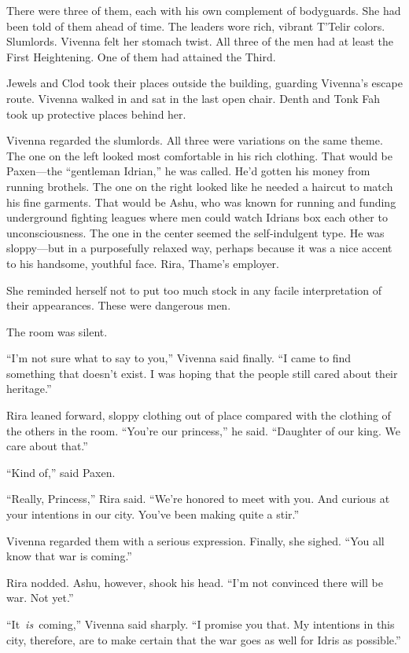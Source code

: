 There were three of them, each with his own complement of bodyguards. She had been told of them ahead of time. The leaders wore rich, vibrant T’Telir colors. Slumlords. Vivenna felt her stomach twist. All three of the men had at least the First Heightening. One of them had attained the Third.

Jewels and Clod took their places outside the building, guarding Vivenna’s escape route. Vivenna walked in and sat in the last open chair. Denth and Tonk Fah took up protective places behind her.

Vivenna regarded the slumlords. All three were variations on the same theme. The one on the left looked most comfortable in his rich clothing. That would be Paxen—the “gentleman Idrian,” he was called. He’d gotten his money from running brothels. The one on the right looked like he needed a haircut to match his fine garments. That would be Ashu, who was known for running and funding underground fighting leagues where men could watch Idrians box each other to unconsciousness. The one in the center seemed the self-indulgent type. He was sloppy—but in a purposefully relaxed way, perhaps because it was a nice accent to his handsome, youthful face. Rira, Thame’s employer.

She reminded herself not to put too much stock in any facile interpretation of their appearances. These were dangerous men.

The room was silent.

“I’m not sure what to say to you,” Vivenna said finally. “I came to find something that doesn’t exist. I was hoping that the people still cared about their heritage.”

Rira leaned forward, sloppy clothing out of place compared with the clothing of the others in the room. “You’re our princess,” he said. “Daughter of our king. We care about that.”

“Kind of,” said Paxen.

“Really, Princess,” Rira said. “We’re honored to meet with you. And curious at your intentions in our city. You’ve been making quite a stir.”

Vivenna regarded them with a serious expression. Finally, she sighed. “You all know that war is coming.”

Rira nodded. Ashu, however, shook his head. “I’m not convinced there will be war. Not yet.”

“It~\textit{is}~coming,” Vivenna said sharply. “I promise you that. My intentions in this city, therefore, are to make certain that the war goes as well for Idris as possible.”


